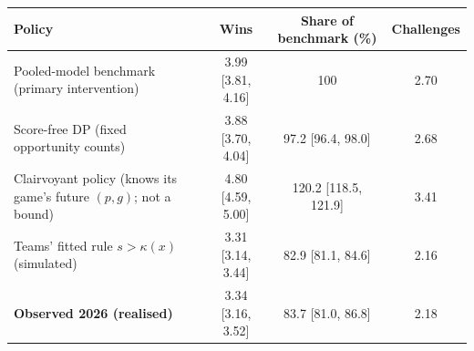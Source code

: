 \begin{tabular}{p{5.0cm}ccc}
\toprule
Policy & Wins & Share of benchmark (\%) & Challenges \\
\midrule
Pooled-model benchmark (primary intervention) & 3.99 [3.81, 4.16] & 100 & 2.70 \\
Score-free DP (fixed opportunity counts) & 3.88 [3.70, 4.04] & 97.2 [96.4, 98.0] & 2.68 \\
Clairvoyant policy (knows its game's future $(p,g)$; not a bound) & 4.80 [4.59, 5.00] & 120.2 [118.5, 121.9] & 3.41 \\
Teams' fitted rule $s>\kappa(x)$ (simulated) & 3.31 [3.14, 3.44] & 82.9 [81.1, 84.6] & 2.16 \\
\textbf{Observed 2026 (realised)} & 3.34 [3.16, 3.52] & 83.7 [81.0, 86.8] & 2.18 \\
\bottomrule
\end{tabular}
